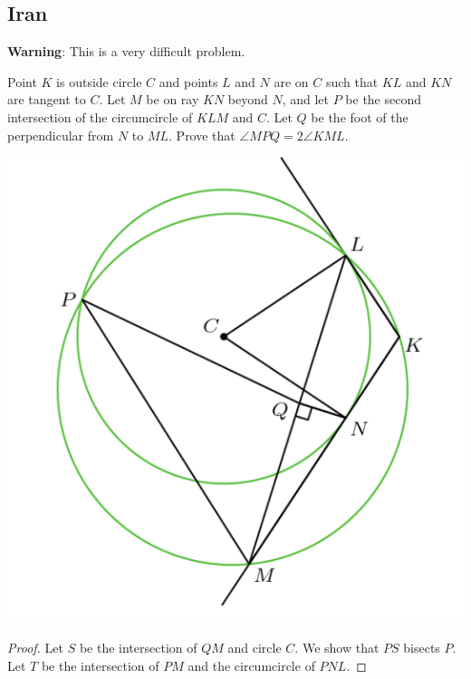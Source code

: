 \documentclass[12pt]{scrartcl}
\newcommand{\<}{\langle}
\renewcommand{\>}{\rangle}
\begin{document}
\subsection{Iran}
\textbf{Warning}: This is a very difficult problem.
\begin{Prob}[Iran] Point $K$ is outside circle $C$ and points $L$ and $N$ are on $C$ such that $KL$ and $KN$ are tangent to $C$.  Let $M$ be on ray $KN$ beyond $N$, and let $P$ be the second intersection of the circumcircle of $KLM$ and $C$.  Let $Q$ be the foot of the perpendicular from $N$ to $ML$.  Prove that $\angle MPQ = 2\angle KML$.
\end{Prob}
\begin{center}
\includegraphics[scale=0.7]{graphics/p2-5.png}
\end{center}
\begin{proof}
Let $S$ be the intersection of $QM$ and circle $C$.  We show that $PS$ bisects $P$.  Let $T$ be the intersection of $PM$ and the circumcircle of $PNL$.  
\end{proof}
\end{document}
